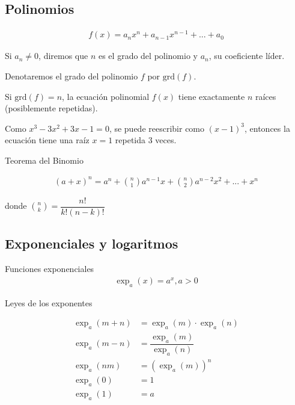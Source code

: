 \subsection{Polinomios}
 
     \begin{align*}
   f(x) = a_{n}x^{n}+a_{n-1}x^{n-1}+...+a_{0}
   \end{align*}
    
   Si $a_{n}\neq 0$, diremos que $n$ es el grado del polinomio y $a_{n}$, su coeficiente líder. 
   
   
   Denotaremos el grado del polinomio $f$ por $\mathrm{grd}(f)$.

{}
Si $\mathrm{grd}(f)=n$, la ecuación polinomial $f(x)$ tiene exactamente $n$ raíces (posiblemente repetidas).


\begin{problema}
 Como $x^{3}-3x^{2}+3x-1=0$, se puede reescribir como $(x-1)^{3}$,  entonces la ecuación tiene una raíz $x=1$ repetida 3 veces. 
\end{problema}


{Teorema del Binomio}
  
     \begin{align*}
   \left( a+x \right)^{n} = 
   a^{n}+\binom{n}{1}a^{n-1}x+\binom{n}{2}a^{n-2}x^{2}+...+x^{n}
   \end{align*}

donde $\binom{n}{k}=\dfrac{n!}{k!\left( n-k \right)!}$

\subsection{Exponenciales y logaritmos}
{Funciones exponenciales}
     \begin{align*}
   \exp_{a}(x) = a^{x}, a> 0
   \end{align*}
   

{Leyes de los exponentes}

        \begin{align*}
    \exp_a(m+n) &= 
     \exp_{a}(m)\cdot \exp_{a}(n) \\
     \exp_a(m-n) &=    
     \dfrac{\exp_a(m)}{\exp_a(n)}     \\
     \exp_a(nm) &=      
     \left( \exp_a(m)\right)^{n}  \\       
     \exp_a(0) &=  1 \\     
     \exp_a(1) &=  a     
     \end{align*}

